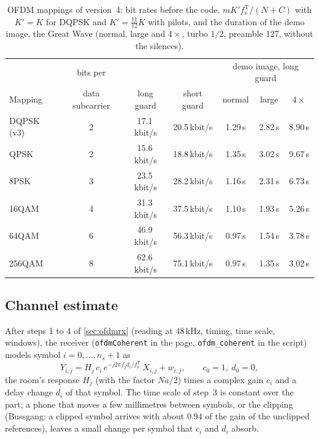 \documentclass[11pt,a4paper]{article}
\newcommand{\kHz}{\,\mathrm{kHz}}
\newcommand{\code}[1]{\texttt{#1}}
\newcommand{\fsT}{f_{\mathrm{s}}^{\mathrm{T}}}
\theoremstyle{remark}
\begin{document}
\begin{table}[ht]
\centering
\caption{OFDM mappings of version~4: bit rates before the code, $m K' \fsT/(N + C)$ with $K' = K$ for DQPSK and $K' = \tfrac{11}{12}K$ with pilots, and the duration of the demo image, the Great Wave (normal, large and $4\times$, turbo $1/2$, preamble 127, without the silences).}
\label{tab:cohmaps}
\small
\begin{tabular}{lcccccc}
\toprule
& bits per & & & \multicolumn{3}{c}{demo image, long guard}\\
Mapping & data subcarrier & long guard & short guard & normal & large & $4\times$\\
\midrule
DQPSK (v3) & 2 & 17.1\,kbit/s & 20.5\,kbit/s & 1.29\,s & 2.82\,s & 8.90\,s\\
QPSK & 2 & 15.6\,kbit/s & 18.8\,kbit/s & 1.35\,s & 3.02\,s & 9.67\,s\\
8PSK & 3 & 23.5\,kbit/s & 28.2\,kbit/s & 1.16\,s & 2.31\,s & 6.73\,s\\
16QAM & 4 & 31.3\,kbit/s & 37.5\,kbit/s & 1.10\,s & 1.93\,s & 5.26\,s\\
64QAM & 6 & 46.9\,kbit/s & 56.3\,kbit/s & 0.97\,s & 1.54\,s & 3.78\,s\\
256QAM & 8 & 62.6\,kbit/s & 75.1\,kbit/s & 0.97\,s & 1.35\,s & 3.02\,s\\
\bottomrule
\end{tabular}
\end{table}

\subsection{Channel estimate}
\label{sec:cohest}
After steps 1 to 4 of \cref{sec:ofdmrx} (reading at $48\kHz$, timing, time scale, windows), the receiver (\code{ofdmCoherent} in the page, \code{ofdm\_coherent} in the script) models symbol $i = 0, \dots, n_s + 1$ as
\begin{equation}
Y_{i,j} = H_j\, c_i\, e^{-j 2\pi f_j d_i/\fsT}\, X_{i,j} + w_{i,j}, \qquad c_0 = 1,\ d_0 = 0,
\label{eq:cohmodel}
\end{equation}
the room's response $H_j$ (with the factor $Na/2$) times a complex gain $c_i$ and a delay change $d_i$ of that symbol. The time scale of step~3 is constant over the part; a phone that moves a few millimetres between symbols, or the clipping (Bussgang: a clipped symbol arrives with about $0.94$ of the gain of the unclipped references), leaves a small change per symbol that $c_i$ and $d_i$ absorb.
\end{document}
